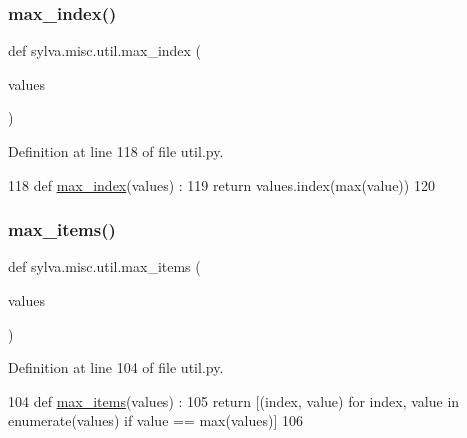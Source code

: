 \subsubsection{\texorpdfstring{max\+\_\+index()}{max\_index()}}
{\footnotesize\ttfamily def sylva.\+misc.\+util.\+max\+\_\+index (\begin{DoxyParamCaption}\item[{}]{values }\end{DoxyParamCaption})}



Definition at line 118 of file util.\+py.


\begin{DoxyCode}
118 \textcolor{keyword}{def }\hyperlink{namespacesylva_1_1misc_1_1util_a32b5da1967e998035c511c75ccccdf89}{max\_index}(values) :
119   \textcolor{keywordflow}{return} values.index(max(value))
120 
\end{DoxyCode}
\mbox{\label{namespacesylva_1_1misc_1_1util_ab250130a1258b854bd002c06c3467f57}} 
\subsubsection{\texorpdfstring{max\+\_\+items()}{max\_items()}}
{\footnotesize\ttfamily def sylva.\+misc.\+util.\+max\+\_\+items (\begin{DoxyParamCaption}\item[{}]{values }\end{DoxyParamCaption})}



Definition at line 104 of file util.\+py.


\begin{DoxyCode}
104 \textcolor{keyword}{def }\hyperlink{namespacesylva_1_1misc_1_1util_ab250130a1258b854bd002c06c3467f57}{max\_items}(values) :
105   \textcolor{keywordflow}{return} [(index, value) \textcolor{keywordflow}{for} index, value \textcolor{keywordflow}{in} enumerate(values) \textcolor{keywordflow}{if} value == max(values)]
106 
\end{DoxyCode}
\mbox{\label{namespacesylva_1_1misc_1_1util_aea54b6ab8ee247ea3d042b09b5333c1c}} 
